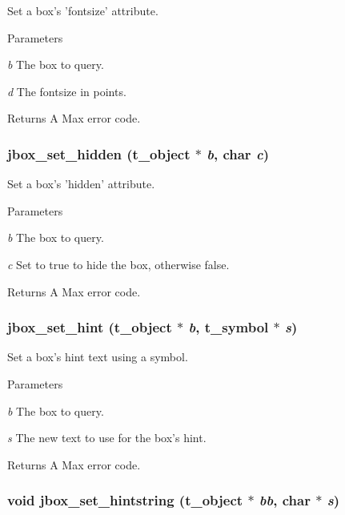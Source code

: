 Set a box's 'fontsize' attribute. 
\begin{DoxyParams}{Parameters}
\item[{\em b}]The box to query. \item[{\em d}]The fontsize in points. \end{DoxyParams}
\begin{DoxyReturn}{Returns}
A Max error code. 
\end{DoxyReturn}
\hypertarget{group__jbox_gaa83c5c91b5687838b4aa221236535b53}{
\subsubsection[{jbox\_\-set\_\-hidden}]{ jbox\_\-set\_\-hidden ({\bf t\_\-object} $\ast$ {\em b}, \/  char {\em c})}}
\label{group__jbox_gaa83c5c91b5687838b4aa221236535b53}


Set a box's 'hidden' attribute. 
\begin{DoxyParams}{Parameters}
\item[{\em b}]The box to query. \item[{\em c}]Set to true to hide the box, otherwise false. \end{DoxyParams}
\begin{DoxyReturn}{Returns}
A Max error code. 
\end{DoxyReturn}
\hypertarget{group__jbox_ga7c7cc83f75351df0fa423c43592e589c}{
\subsubsection[{jbox\_\-set\_\-hint}]{ jbox\_\-set\_\-hint ({\bf t\_\-object} $\ast$ {\em b}, \/  {\bf t\_\-symbol} $\ast$ {\em s})}}
\label{group__jbox_ga7c7cc83f75351df0fa423c43592e589c}


Set a box's hint text using a symbol. 
\begin{DoxyParams}{Parameters}
\item[{\em b}]The box to query. \item[{\em s}]The new text to use for the box's hint. \end{DoxyParams}
\begin{DoxyReturn}{Returns}
A Max error code. 
\end{DoxyReturn}
\hypertarget{group__jbox_gad1651ffa12cf40c55de24e892be2fa42}{
\subsubsection[{jbox\_\-set\_\-hintstring}]{\setlength{\rightskip}{0pt plus 5cm}void jbox\_\-set\_\-hintstring ({\bf t\_\-object} $\ast$ {\em bb}, \/  char $\ast$ {\em s})}}
\label{group__jbox_gad1651ffa12cf40c55de24e892be2fa42}


